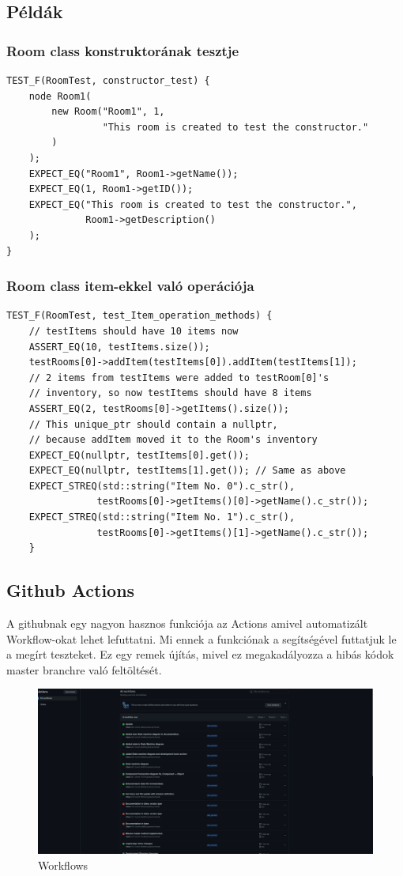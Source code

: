 \documentclass{scrarticle}
\begin{document}
\subsection{Példák}
\subsubsection{Room class konstruktorának tesztje}
\begin{lstlisting}
TEST_F(RoomTest, constructor_test) {
    node Room1(
        new Room("Room1", 1, 
                 "This room is created to test the constructor."
        )
    );
    EXPECT_EQ("Room1", Room1->getName());
    EXPECT_EQ(1, Room1->getID());
    EXPECT_EQ("This room is created to test the constructor.", 
              Room1->getDescription()
    );
}
\end{lstlisting}
\subsubsection{Room class item-ekkel való operációja}
\begin{lstlisting}
TEST_F(RoomTest, test_Item_operation_methods) {
    // testItems should have 10 items now
    ASSERT_EQ(10, testItems.size());
    testRooms[0]->addItem(testItems[0]).addItem(testItems[1]);
    // 2 items from testItems were added to testRoom[0]'s 
    // inventory, so now testItems should have 8 items
    ASSERT_EQ(2, testRooms[0]->getItems().size());
    // This unique_ptr should contain a nullptr, 
    // because addItem moved it to the Room's inventory
    EXPECT_EQ(nullptr, testItems[0].get()); 
    EXPECT_EQ(nullptr, testItems[1].get()); // Same as above
    EXPECT_STREQ(std::string("Item No. 0").c_str(), 
                testRooms[0]->getItems()[0]->getName().c_str());
    EXPECT_STREQ(std::string("Item No. 1").c_str(), 
                testRooms[0]->getItems()[1]->getName().c_str());
    }
\end{lstlisting}
\subsection{Github Actions}
A githubnak egy nagyon hasznos funkciója az Actions amivel automatizált Workflow-okat lehet lefuttatni. Mi ennek a funkciónak a segítségével futtatjuk le a megírt teszteket. Ez egy remek újítás, mivel ez megakadályozza a hibás kódok master branchre való feltöltését.
\begin{figure}[H]
    \includegraphics[width=1.0\columnwidth]{github_actions.png}
    \caption{Workflows}\label{fig:6}
\end{figure}
\newpage
\end{document}
